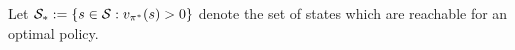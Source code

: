 %
%
%
%	
%	
%	
%	



Let $\mathcal{S}_*:=\{s \in \mathcal{S}: v_{\pi^*}(s)>0\}$ denote the set of states which are reachable for an optimal policy.

